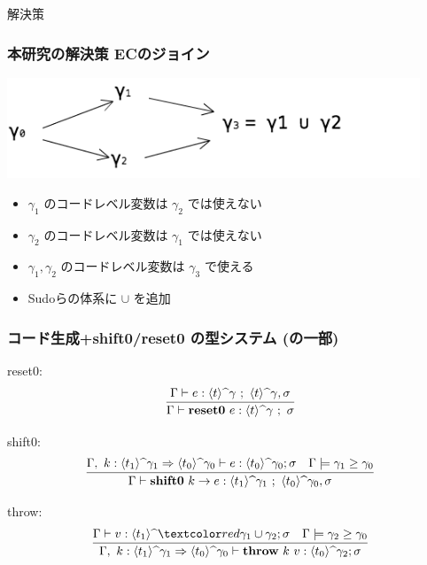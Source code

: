


\begin{frame}
  \center
  \huge{解決策}
\end{frame}

\begin{frame}
  \frametitle{本研究の解決策 ECのジョイン}
  \flushleft
  \includegraphics[clip,height=3cm]{./img/ecgraph.png}
  \begin{itemize}
  \item<2-> $\gamma_1$ のコードレベル変数は $\gamma_2$ では使えない
  \item<2-> $\gamma_2$ のコードレベル変数は $\gamma_1$ では使えない
  \item<2-> $\gamma_1, \gamma_2$ のコードレベル変数は $\gamma_3$ で使える
  \item<3->[$\Rightarrow$] Sudoらの体系に $\cup$ を追加
  \end{itemize}
\end{frame}

\begin{frame}[fragile]
  \frametitle{コード生成+shift0/reset0 の型システム\small{ (の一部)}}
  reset0:
  \[
    \infer{\Gamma \vdash \resetz{e} : \codeTs{t}{\gamma} ~;~ \sigma}
    {\Gamma \vdash e : \codeTs{t}{\gamma} ~;~ \codeTs{t}{\gamma}, \sigma}
  \]

  shift0:
  \[
    \infer{\Gamma \vdash \shiftz{k}{e} : \codeTs{t_1}{\gamma_1} ~;~ \codeTs{t_0}{\gamma_0},\sigma}
    {\Gamma,~k:\contT{\codeTs{t_1}{\gamma_1}}{\codeTs{t_0}{\gamma_0}}
      \vdash e : \codeTs{t_0}{\gamma_0} ; \sigma
      & \Gamma \models \gamma_1 \ord \gamma_0
    }
  \]

  throw:
  \[
    \infer
    {\Gamma,~k:\contT{\codeTs{t_1}{\gamma_1}}{\codeTs{t_0}{\gamma_0}}
      \vdash \throw{k}{v} : \codeTs{t_0}{\gamma_2} ; \sigma}
    {\Gamma
      \vdash v : \codeTs{t_1}{\red{\gamma_1 \cup \gamma_2}} ; \sigma
      & \Gamma \models \gamma_2 \ord \gamma_0
    }
  \]
\end{frame}


